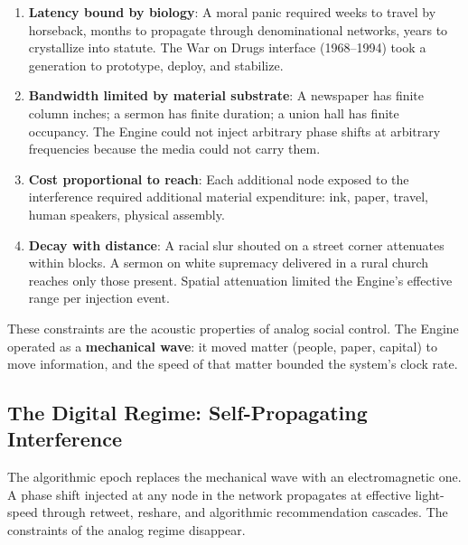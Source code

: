 \begin{enumerate}
    \item \textbf{Latency bound by biology}: A moral panic required weeks to travel by horseback, months to propagate through denominational networks, years to crystallize into statute. The War on Drugs interface (1968--1994) took a generation to prototype, deploy, and stabilize.
    \item \textbf{Bandwidth limited by material substrate}: A newspaper has finite column inches; a sermon has finite duration; a union hall has finite occupancy. The Engine could not inject arbitrary phase shifts at arbitrary frequencies because the media could not carry them.
    \item \textbf{Cost proportional to reach}: Each additional node exposed to the interference required additional material expenditure: ink, paper, travel, human speakers, physical assembly.
    \item \textbf{Decay with distance}: A racial slur shouted on a street corner attenuates within blocks. A sermon on white supremacy delivered in a rural church reaches only those present. Spatial attenuation limited the Engine's effective range per injection event.
\end{enumerate}

These constraints are the acoustic properties of analog social control. The Engine operated as a \textbf{mechanical wave}: it moved matter (people, paper, capital) to move information, and the speed of that matter bounded the system's clock rate.

\subsection{The Digital Regime: Self-Propagating Interference}

The algorithmic epoch replaces the mechanical wave with an electromagnetic one. A phase shift injected at any node in the network propagates at effective light-speed through retweet, reshare, and algorithmic recommendation cascades. The constraints of the analog regime disappear.

